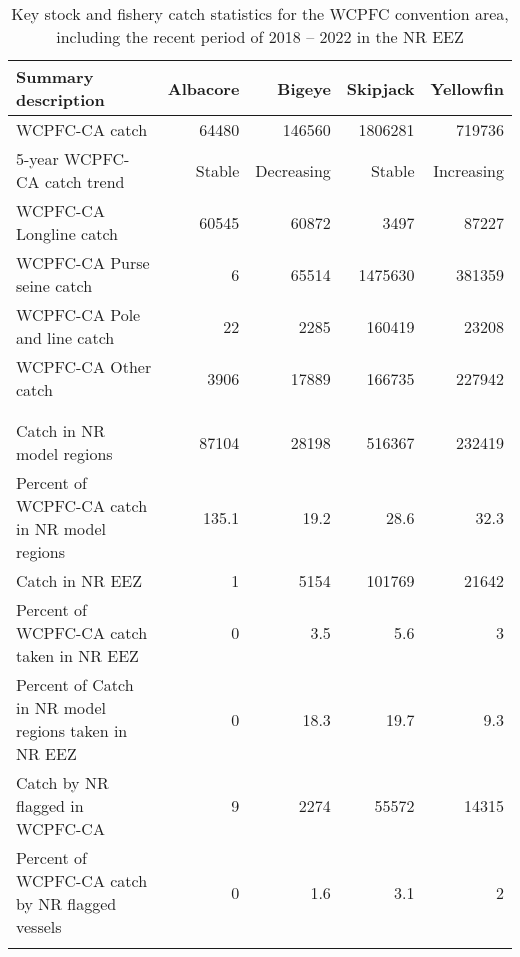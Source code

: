 \begin{longtable}{lrrrr}
\caption{Key stock and fishery catch statistics for the WCPFC convention area, including the recent period of 2018 -- 2022 in the NR EEZ} \\ 
  \hline
Summary description & Albacore & Bigeye & Skipjack & Yellowfin \\ 
  \hline
WCPFC-CA catch & 64480 & 146560 & 1806281 & 719736 \\ 
  5-year WCPFC-CA catch trend & Stable & Decreasing & Stable & Increasing \\ 
  WCPFC-CA Longline catch & 60545 & 60872 & 3497 & 87227 \\ 
  WCPFC-CA Purse seine catch & 6 & 65514 & 1475630 & 381359 \\ 
  WCPFC-CA Pole and line catch & 22 & 2285 & 160419 & 23208 \\ 
  WCPFC-CA Other catch & 3906 & 17889 & 166735 & 227942 \\ 
   &  &  &  &  \\ 
   &  &  &  &  \\ 
   \hline
Catch in NR model regions & 87104 & 28198 & 516367 & 232419 \\ 
  Percent of WCPFC-CA catch in NR model regions & 135.1 & 19.2 & 28.6 & 32.3 \\ 
  Catch in NR EEZ & 1 & 5154 & 101769 & 21642 \\ 
  Percent of WCPFC-CA catch taken in NR EEZ & 0 & 3.5 & 5.6 & 3 \\ 
  Percent of Catch in NR model regions taken in NR EEZ & 0 & 18.3 & 19.7 & 9.3 \\ 
  Catch by NR flagged in WCPFC-CA & 9 & 2274 & 55572 & 14315 \\ 
  Percent of WCPFC-CA catch by NR flagged vessels & 0 & 1.6 & 3.1 & 2 \\ 
  \hline
\label{cat_sum_tab}
\end{longtable}
